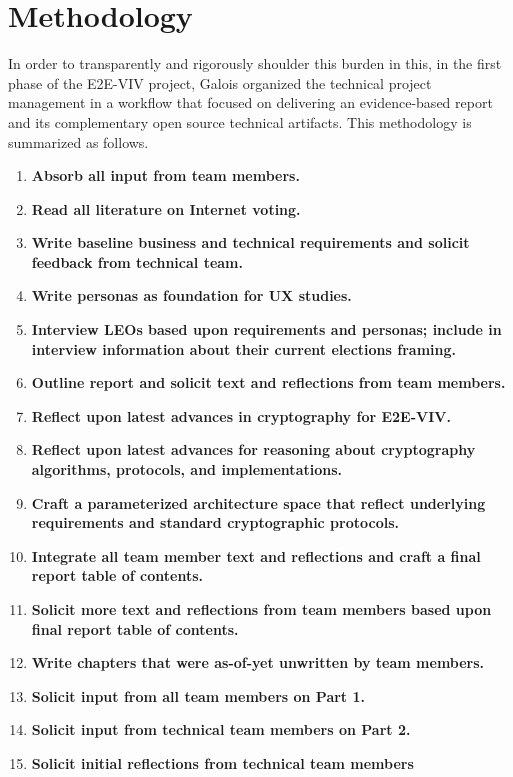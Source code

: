 \section{Methodology}

In order to transparently and rigorously shoulder this burden in this,
in the first phase of the E2E-VIV project, Galois organized the
technical project management in a workflow that focused on delivering
an evidence-based report and its complementary open source technical
artifacts.  This methodology is summarized as follows.

\begin{enumerate}
\item \textbf{Absorb all input from team members.}
\item \textbf{Read all literature on Internet voting.}
\item \textbf{Write baseline business and technical requirements and
    solicit feedback from technical team.}
\item \textbf{Write personas as foundation for UX studies.}
\item \textbf{Interview LEOs based upon requirements and personas;
    include in interview information about their current elections
    framing.}
\item \textbf{Outline report and solicit text and reflections from
    team members.}
\item \textbf{Reflect upon latest advances in cryptography for E2E-VIV.}
\item \textbf{Reflect upon latest advances for reasoning about
    cryptography algorithms, protocols, and implementations.}
\item \textbf{Craft a parameterized architecture space that reflect
    underlying requirements and standard cryptographic protocols.}
\item \textbf{Integrate all team member text and reflections and craft
    a final report table of contents.}
\item \textbf{Solicit more text and reflections from team members
    based upon final report table of contents.}
\item \textbf{Write chapters that were as-of-yet unwritten by team
    members.}
\item \textbf{Solicit input from all team members on Part 1.}
\item \textbf{Solicit input from technical team members on Part 2.}
\item \textbf{Solicit initial reflections from technical team members
}
\end{enumerate}
